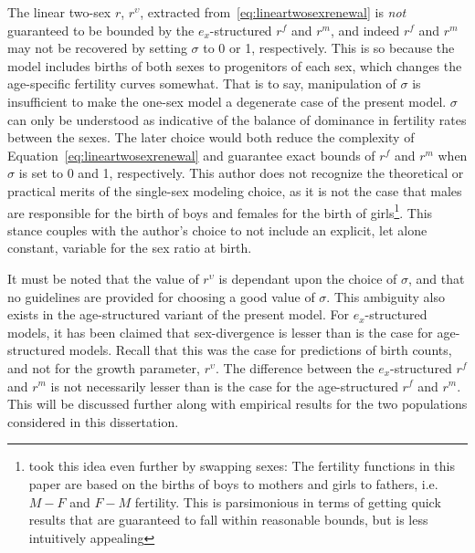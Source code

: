 The linear two-sex $r$, $r^\upsilon$, extracted from~\eqref{eq:lineartwosexrenewal} 
is \textit{not} guaranteed to be bounded by the $e_x$-structured $r^f$ and $r^m$,
and indeed $r^f$ and $r^m$ may not be recovered by setting $\sigma$ to 0 or 1,
respectively. This is so because the model includes births of both sexes to
progenitors of each sex, which changes the age-specific fertility curves
somewhat. That is to say, manipulation of $\sigma$ is insufficient to make the
one-sex model a degenerate case of the present model. $\sigma$ can only be
understood as indicative of the balance of dominance in fertility rates between
the sexes. The later choice would both reduce the complexity of
Equation~\ref{eq:lineartwosexrenewal} and guarantee exact bounds of $r^f$ and $r^m$ 
when $\sigma$ is set to 0 and 1, respectively. This author does not recognize 
the theoretical or practical merits of the single-sex modeling choice, as it 
is not the case that males are responsible for the birth of boys and females 
for the birth of girls\footnote{\citet{pollard1948measurement} took this idea
even further by swapping sexes: The fertility functions in this paper are based on the births of boys to mothers and girls to fathers, i.e. $M-F$ and $F-M$ fertility. This is parsimonious 
in terms of getting quick results that are guaranteed to fall within reasonable bounds, but is less
intuitively appealing}. This stance couples with the author's choice to not
include an explicit, let alone constant, variable for the sex ratio at birth.

It must be
noted that the value of $r^\upsilon$ is dependant upon the choice of $\sigma$, 
and that no guidelines are provided for choosing a good value of $\sigma$. 
This ambiguity also exists in the age-structured variant of the present model. 
For $e_x$-structured models, it has been claimed that sex-divergence is lesser than is the case for
age-structured models. Recall that this was the case for predictions of birth
counts, and not for the growth parameter, $r^\upsilon$. The
difference between the $e_x$-structured $r^f$ and $r^m$ is not necessarily lesser than is the case for
the age-structured $r^f$ and $r^m$. This will be discussed further along with
empirical results for the two populations considered in this dissertation.

